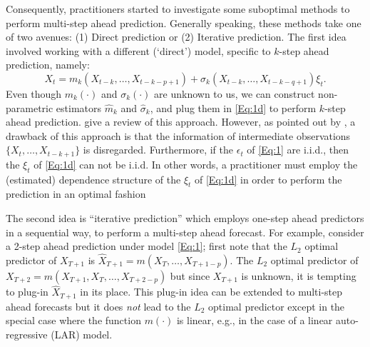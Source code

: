 \documentclass[a4paper]{article}
\begin{document}
Consequently, practitioners started to investigate some suboptimal methods to
perform multi-step ahead prediction. Generally speaking, these methods   take one of two avenues: (1) Direct prediction or (2) Iterative prediction.
The first idea involved  working with a different (`direct')   model, 
specific to $k$-step ahead prediction, namely:
\begin{equation}
\label{Eq:1d}
    X_t = m_{k}(X_{t-k},\ldots,X_{t-k-p+1}) + \sigma_{k}
(X_{t-k},\ldots,X_{t-k-q+1})\xi_t.
\end{equation}
Even though $m_{k}(\cdot)$ and $\sigma_{k}(\cdot)$ are unknown to us, we can  construct non-parametric estimators $\widehat{m}_{k}$ and $\widehat{\sigma}_{k}$, and plug them in \cref{Eq:1d} to perform
$k$-step ahead prediction.
\cite{lee2003new} give a review of this approach. However, as pointed out by \cite{chen2004nonparametric}, a drawback of this approach is that the information of intermediate observations $\{X_{t},\ldots,X_{t-k+1}\}$ is disregarded.
Furthermore, if the $\epsilon_t$ of \cref{Eq:1}  are i.i.d., then
the $\xi_t$ of \cref{Eq:1d} can not be i.i.d.  In other words, a practitioner
must employ the (estimated) dependence structure of the $\xi_t$ of \cref{Eq:1d}
in order to perform the prediction in an optimal fashion

  The second idea is ``iterative prediction'' which employs 
one-step ahead predictors in a sequential way, to perform
a multi-step ahead forecast. For example, consider a 2-step ahead prediction
under model \cref{Eq:1};    first note that the $L_2$ optimal   predictor of 
$X_{T+1}$ is  $\hat X_{T+1}=m(X_{T},\ldots,X_{T+1-p})$.
The $L_2$  optimal predictor of $X_{T+2} = m(X_{T+ 1},X_T,\ldots,X_{T+2-p})$ but 
  since $X_{T+ 1}$ is unknown, it is tempting to plug-in $\hat X_{T+1}$
in its place.  This plug-in idea can be extended to multi-step ahead forecasts
but it does {\it not} lead to the $L_2$ optimal predictor except in the special 
case where the function $m(\cdot)$ is linear, e.g., in the case 
  of a linear auto-regressive (LAR) model.
\end{document}
